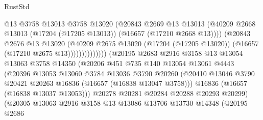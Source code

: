 \begin{lexlean}{RustStd}
\begin{coremodule}
                                        @13
                                        @3758
                                        @13013
                                        @3758
                                        @13020
                                        (@20843
                                          @2669
                                          @13
                                          @13013
                                          (@40209
                                            @2668
                                            @13013
                                            (@17204 (@17205 @13013))
                                            (@16657 (@17210 @2668 @13))))
                                        (@20843
                                          @2676
                                          @13
                                          @13020
                                          (@40209
                                            @2675
                                            @13020
                                            (@17204 (@17205 @13020))
                                            (@16657 (@17210 @2675 @13))))))))))))))
                    (@20195
                      @2683
                      @2916
                      @3158
                      @13
                      @13054
                      @13063
                      @3758
                      @14350
                      (@20206
                        @451
                        @735
                        @140
                        @13054
                        @13061
                        @4443
                        (@20396
                          @13053
                          @13060
                          @3784
                          @13036
                          @3790
                          @20260
                          (@20410 @13046 @3790 @20421 @20263 @16836 (@16657 (@16838 @13047 @3758)))
                          @16836
                          (@16657 (@16838 @13037 @13053)))
                        @20278
                        @20281
                        @20284
                        @20288
                        @20293
                        @20299)
                      (@20305
                        @13063
                        @2916
                        @3158
                        @13
                        @13086
                        @13706
                        @13730
                        @14348
                        (@20195
                          @2686

\end{coremodule}
\end{lexlean}
